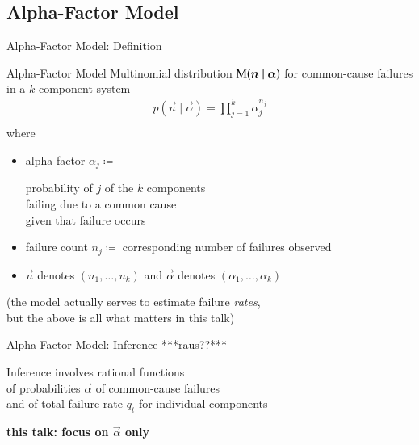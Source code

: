 \documentclass{beamer}
\begin{document}
\subsection{Alpha-Factor Model}

\begin{frame}{Alpha-Factor Model: Definition}
  \begin{block}{Alpha-Factor Model} %
    Multinomial distribution $\operatorname{M}({\bm n}\mid{\bm\alpha})$ for common-cause failures \\
    in a $k$-component system\vspace*{-2ex}
    \begin{align*}
      p(\vec{n}\mid\vec{\alpha})=\prod_{j=1}^k\alpha_j^{n_j}\\[-5ex]
    \end{align*}
    where
    \begin{itemize}
    \item \alert{alpha-factor}
      $\alpha_j\coloneqq$
      \parbox[t]{0.6\textwidth}{%
        probability of $j$ of the $k$ components \\
        failing due to a common cause \\
        given that failure occurs
      }
    \item \alert{failure count}
      $n_j\coloneqq$ corresponding number of failures observed
    \item $\vec{n}$ denotes $(n_1,\dots,n_k)$ and $\vec{\alpha}$ denotes $(\alpha_1,\dots,\alpha_k)$
    \end{itemize}
  \end{block}
  (the model actually serves to estimate failure \emph{rates},\\ but the above is all what matters in this talk)
\end{frame}

\begin{frame}{Alpha-Factor Model: Inference ***raus??***}
  \begin{block}{Inference}
    involves rational functions \\
    of probabilities $\vec{\alpha}$ of common-cause failures\\
    and of total failure rate $q_t$ for individual components
  \end{block}
  \begin{center}
    \textbf{this talk: focus on $\vec{\alpha}$ only}
  \end{center}
\end{frame}
\end{document}
